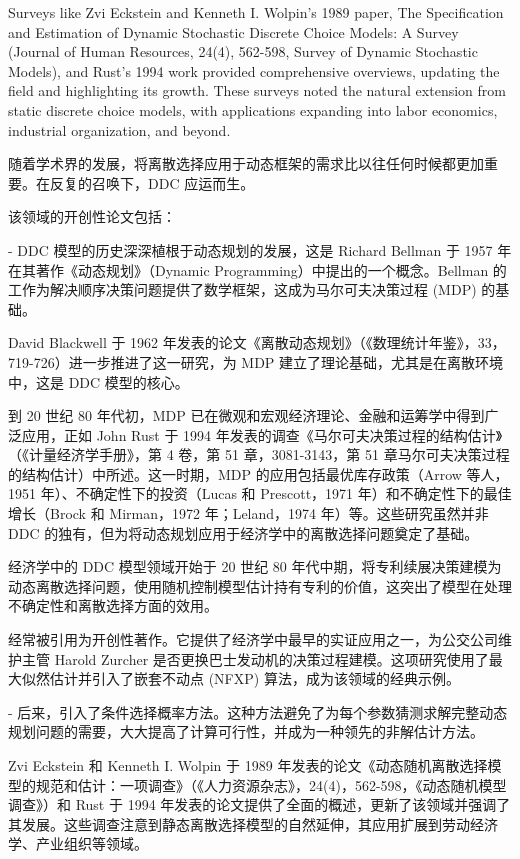 \documentclass[a4paper,12pt,oneside]{book} %
\begin{document}
Surveys like Zvi Eckstein and Kenneth I. Wolpin's 1989 paper, The Specification and Estimation of Dynamic Stochastic Discrete Choice Models: A Survey (Journal of Human Resources, 24(4), 562-598, Survey of Dynamic Stochastic Models), and Rust's 1994 work provided comprehensive overviews, updating the field and highlighting its growth. These surveys noted the natural extension from static discrete choice models, with applications expanding into labor economics, industrial organization, and beyond.

随着学术界的发展，将离散选择应用于动态框架的需求比以往任何时候都更加重要。在反复的召唤下，DDC 应运而生。

该领域的开创性论文包括：

- DDC 模型的历史深深植根于动态规划的发展，这是 Richard Bellman 于 1957 年在其著作《动态规划》（Dynamic Programming）中提出的一个概念。Bellman 的工作为解决顺序决策问题提供了数学框架，这成为马尔可夫决策过程 (MDP) 的基础。 

David Blackwell 于 1962 年发表的论文《离散动态规划》（《数理统计年鉴》，33，719-726）进一步推进了这一研究，为 MDP 建立了理论基础，尤其是在离散环境中，这是 DDC 模型的核心。

到 20 世纪 80 年代初，MDP 已在微观和宏观经济理论、金融和运筹学中得到广泛应用，正如 John Rust 于 1994 年发表的调查《马尔可夫决策过程的结构估计》（《计量经济学手册》，第 4 卷，第 51 章，3081-3143，第 51 章马尔可夫决策过程的结构估计）中所述。这一时期，MDP 的应用包括最优库存政策（Arrow 等人，1951 年）、不确定性下的投资（Lucas 和 Prescott，1971 年）和不确定性下的最佳增长（Brock 和 Mirman，1972 年；Leland，1974 年）等。这些研究虽然并非 DDC 的独有，但为将动态规划应用于经济学中的离散选择问题奠定了基础。

经济学中的 DDC 模型领域开始于 20 世纪 80 年代中期，\cite{pakesPatentsOptionsEstimates1986}将专利续展决策建模为动态离散选择问题，使用随机控制模型估计持有专利的价值，这突出了模型在处理不确定性和离散选择方面的效用。

\cite{rustOptimalReplacementGMC1987}经常被引用为开创性著作。它提供了经济学中最早的实证应用之一，为公交公司维护主管 Harold Zurcher 是否更换巴士发动机的决策过程建模。这项研究使用了最大似然估计并引入了嵌套不动点 (NFXP) 算法，成为该领域的经典示例。

- 后来，\cite{hotzConditionalChoiceProbabilities1993}引入了条件选择概率方法。这种方法避免了为每个参数猜测求解完整动态规划问题的需要，大大提高了计算可行性，并成为一种领先的非解估计方法。

Zvi Eckstein 和 Kenneth I. Wolpin 于 1989 年发表的论文《动态随机离散选择模型的规范和估计：一项调查》（《人力资源杂志》，24(4)，562-598，《动态随机模型调查》）和 Rust 于 1994 年发表的论文提供了全面的概述，更新了该领域并强调了其发展。这些调查注意到静态离散选择模型的自然延伸，其应用扩展到劳动经济学、产业组织等领域。
\end{document}
